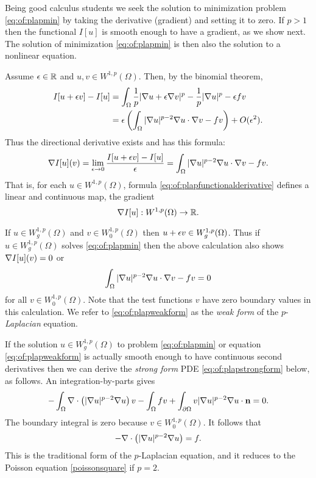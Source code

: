 Being good calculus students we seek the solution to minimization problem \eqref{eq:of:plapmin} by taking the derivative (gradient) and setting it to zero.  If $p>1$ then the functional $I[u]$ is smooth enough to have a gradient, as we show next.  The solution of minimization \eqref{eq:of:plapmin} is then also the solution to a nonlinear equation.

Assume $\epsilon\in \mathbb{R}$ and $u,v \in W^{1,p}(\Omega)$.  Then, by the binomial theorem,
\begin{align*}
I[u+\epsilon v] - I[u] &= \int_\Omega \frac{1}{p} |\nabla u + \epsilon \nabla v|^p - \frac{1}{p} |\nabla u|^p - \epsilon f v \\
   &= \epsilon \left(\int_\Omega |\nabla u|^{p-2} \nabla u \cdot \nabla v - f v\right) + O(\epsilon^2).
\end{align*}
Thus the directional derivative exists and has this formula:
\begin{equation}
\nabla I[u](v) = \lim_{\epsilon\to 0} \frac{I[u+\epsilon v] - I[u]}{\epsilon} = \int_\Omega |\nabla u|^{p-2} \nabla u \cdot \nabla v - f v. \label{eq:of:plapfunctionalderivative}
\end{equation}
That is, for each $u \in W^{1,p}(\Omega)$, formula \eqref{eq:of:plapfunctionalderivative} defines a linear and continuous map, the gradient
   $$\nabla I[u] : W^{1,p}(\Omega) \to \mathbb{R}.$$

If $u \in W_g^{1,p}(\Omega)$ and $v\in W_0^{1,p}(\Omega)$ then $u+\epsilon v\in W_g^{1,p}(\Omega)$.  Thus if $u \in W_g^{1,p}(\Omega)$ solves \eqref{eq:of:plapmin} then the above calculation also shows $\nabla I[u](v)=0$ or
\begin{equation}
\int_\Omega |\nabla u|^{p-2} \nabla u \cdot \nabla v - f v = 0 \label{eq:of:plapweakform}
\end{equation}
for all $v\in W_0^{1,p}(\Omega)$.  Note that the test functions $v$ have zero boundary values in this calculation.  We refer to \eqref{eq:of:plapweakform} as the \emph{weak form} of the $p$-\emph{Laplacian} equation.

If the solution $u \in W_g^{1,p}(\Omega)$ to problem \eqref{eq:of:plapmin} or equation \eqref{eq:of:plapweakform} is actually smooth enough to have continuous second derivatives then we can derive the \emph{strong form} PDE \eqref{eq:of:plapstrongform} below, as follows.  An integration-by-parts \citep[Appendix C]{Evans2010} gives
    $$-\int_\Omega \nabla\cdot\left(|\nabla u|^{p-2} \nabla u\right) v - \int_\Omega f v + \int_{\partial \Omega} v |\nabla u|^{p-2} \nabla u \cdot \mathbf{n} = 0.$$
The boundary integral is zero because $v\in W_0^{1,p}(\Omega)$.  It follows that
\begin{equation}
- \nabla\cdot\left(|\nabla u|^{p-2} \nabla u\right) = f.
\label{eq:of:plapstrongform}
\end{equation}
This is the traditional form of the $p$-Laplacian equation, and it reduces to the Poisson equation \eqref{poissonsquare} if $p=2$.

